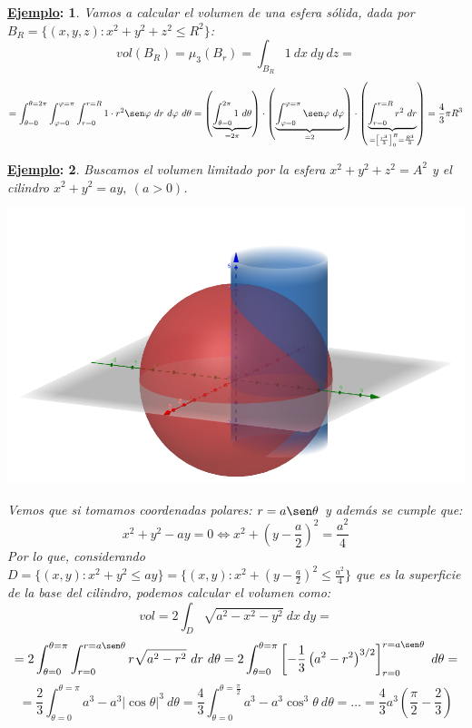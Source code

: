 \documentclass[10pt,a4paper,openright]{book}
\theoremstyle{break}
\newtheorem*{ej}{\underline{Ejemplo}:}
\newcommand{\dif}[1]{\ d#1}
\begin{document}
\begin{ej}
Vamos a calcular el volumen de una esfera sólida, dada por $B_R = \{\left(x, y, z\right) : x^2 + y^2 + z^2 \le R^2\}$:
$$vol \left(B_R\right) = \mu_3 \left(B_r\right) = \int_{B_R} 1 \dif{x} \dif{y} \dif{z}=$$
$$= \int_{\theta = 0}^{\theta = 2\pi }\int_{\varphi = 0}^{\varphi = \pi} \int_{r = 0}^{r = R} 1 \cdot r^2 \sen \varphi \dif{r} \dif{\varphi } \dif{\theta} = \left(\underbrace{\int_{\theta = 0}^{2\pi }1 \dif{\theta }}_{= 2\pi} \right) \cdot \left(\underbrace{\int_{\varphi = 0}^{\varphi = \pi} \sen \varphi \dif{\varphi }}_{= 2}\right) \cdot \left(\underbrace{\int_{r = 0}^{r = R} r^2 \dif{r}}_{= \left[\frac{r^3}{3}\right]_0^R = \frac{R^3}{3}}\right) = \frac{4}{3} \pi R^3$$
\end{ej}

\begin{ej}
Buscamos el volumen limitado por la esfera $x^2 + y^2 + z^2 = A^2$ y el cilindro $x^2 + y^2 = ay,\ \left(a > 0\right)$.

\begin{center}
\includegraphics[scale=0.20]{Cone and Sphere}
\end{center}

Vemos que si tomamos coordenadas polares: $r = a\sen \theta$ y además se cumple que:
$$x^2 + y^2 - ay = 0 \Leftrightarrow x^2 + \left(y - \frac{a}{2}\right)^2 = \frac{a^2}{4}$$
Por lo que, considerando $D = \{\left(x, y\right): x^2 + y^2 \le ay\} = \{\left(x, y\right): x^2 + \left(y - \frac{a}{2}\right)^2 \le \frac{a^2}{4}\}$ que es la superficie de la base del cilindro, podemos calcular el volumen como: 
$$vol = 2 \int_{D} \sqrt{a^2 - x^2 - y^2} \dif{x} \dif{y} = $$
$$= 2 \int_{\theta = 0}^{\theta = \pi} \int_{r = 0}^{r = a\sen \theta } r \sqrt{a^2 - r^2} \dif{r} \dif{\theta} = 2 \int_{\theta = 0}^{\theta = \pi} \left[-\frac{1}{3} \left(a^2 - r^2 \right)^{3/2}\right]_{r = 0}^{r = a\sen \theta }\dif{\theta} = $$
$$= \frac{2}{3} \int_{\theta = 0}^{\theta = \pi} a^3 - a^3 \lvert \cos \theta  \rvert^3 \dif{\theta } = \frac{4}{3} \int_{\theta = 0}^{\theta = \frac{\pi}{2}} a^3 - a^3 \cos^3 \theta \dif{\theta } = \ldots = \boxed{\frac{4}{3}a^3 \left(\frac{\pi}{2} - \frac{2}{3}\right)} $$
\end{ej}
\end{document}
